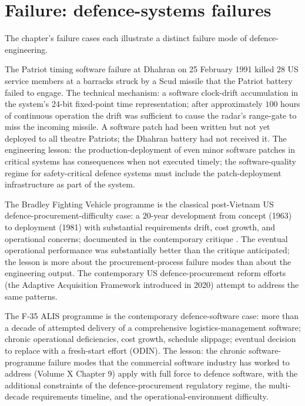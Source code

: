 \section{Failure: defence-systems failures}

The chapter's failure cases each illustrate a distinct failure mode of defence-engineering.

The Patriot timing software failure at Dhahran on 25 February 1991 \cite{acc:gao-patriot-1992} killed $28$ US service members at a barracks struck by a Scud missile that the Patriot battery failed to engage. The technical mechanism: a software clock-drift accumulation in the system's 24-bit fixed-point time representation; after approximately $100$ hours of continuous operation the drift was sufficient to cause the radar's range-gate to miss the incoming missile. A software patch had been written but not yet deployed to all theatre Patriots; the Dhahran battery had not received it. The engineering lesson: the production-deployment of even minor software patches in critical systems has consequences when not executed timely; the software-quality regime for safety-critical defence systems must include the patch-deployment infrastructure as part of the system.

The Bradley Fighting Vehicle programme is the classical post-Vietnam US defence-procurement-difficulty case: a $20$-year development from concept (1963) to deployment (1981) with substantial requirements drift, cost growth, and operational concerns; documented in the contemporary critique \cite{paper:burton-pentagon-wars-1993}. The eventual operational performance was substantially better than the critique anticipated; the lesson is more about the procurement-process failure modes than about the engineering output. The contemporary US defence-procurement reform efforts (the Adaptive Acquisition Framework introduced in 2020) attempt to address the same patterns.

The F-35 ALIS programme \cite{acc:gao-f35-alis-2020} is the contemporary defence-software case: more than a decade of attempted delivery of a comprehensive logistics-management software; chronic operational deficiencies, cost growth, schedule slippage; eventual decision to replace with a fresh-start effort (ODIN). The lesson: the chronic software-programme failure modes that the commercial software industry has worked to address (Volume X Chapter 9) apply with full force to defence software, with the additional constraints of the defence-procurement regulatory regime, the multi-decade requirements timeline, and the operational-environment difficulty.

